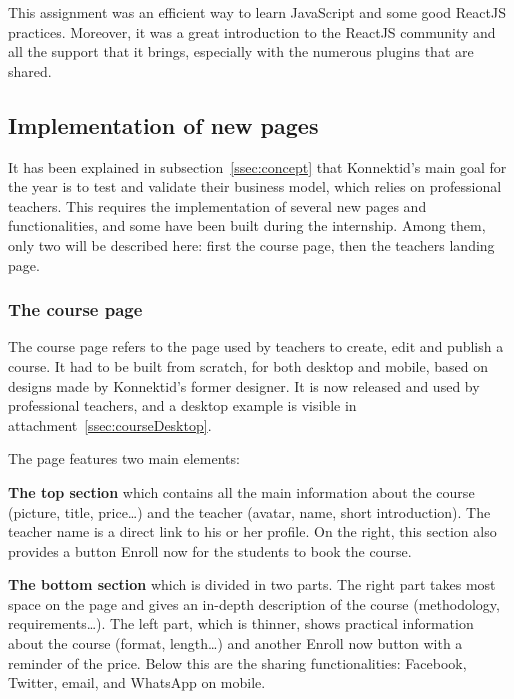 This assignment was an efficient way to learn JavaScript and some good ReactJS practices. Moreover, it was a great introduction to the ReactJS community and all the support that it brings, especially with the numerous plugins that are shared.

\subsection{Implementation of new pages}
\label{ssec:new_pages}

It has been explained in {\sc subsection}~\ref{ssec:concept} that Konnektid's main goal for the year is to test and validate their business model, which relies on
professional teachers. This requires the implementation of several new pages and functionalities, and some have been built during the internship. Among them, only
two will be described here: first the course page, then the teachers landing page.

\subsubsection{The course page}
\label{sssec:coursePage}

The course page refers to the page used by teachers to create, edit and publish a course. It had to be built from scratch, for both desktop and mobile, based on designs
made by Konnektid's former designer. It is now released and used by professional teachers, and a desktop example is visible in {\sc attachment}~\ref{ssec:courseDesktop}.

The page features two main elements:

\textbf{The top section} which contains all the main information about the course (picture, title, price\ldots) and the teacher (avatar, name, short introduction).
The teacher name is a direct link to his or her profile. On the right, this section also provides a button \guillemotleft{} Enroll now \guillemotright{} for the students
to book the course.

\textbf{The bottom section} which is divided in two parts. The right part takes most space on the page and gives an in-depth description of the course
(methodology, requirements\ldots). The left part, which is thinner, shows practical information about the course (format, length\ldots) and another
\guillemotleft{} Enroll now \guillemotright{} button with a reminder of the price. Below this are the sharing functionalities: Facebook, Twitter,
email, and WhatsApp on mobile.

